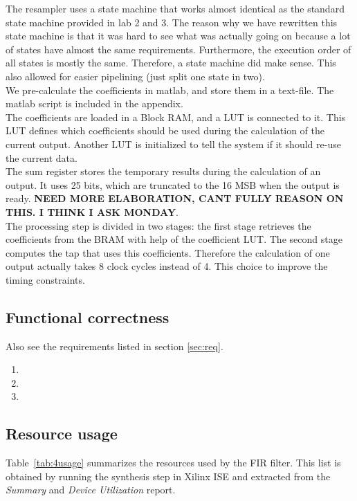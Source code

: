 \documentclass[a4paper,twoside,11pt, fleqn]{article}
\begin{document}
The resampler uses a state machine that works almost identical as the standard state machine provided in lab 2 and 3. The reason why we have rewritten this state machine is that it was hard to see what was actually going on because a lot of states have almost the same requirements. Furthermore, the execution order of all states is mostly the same. Therefore, a state machine did make sense. This also allowed for easier pipelining (just split one state in two).\\

We pre-calculate the coefficients in matlab, and store them in a text-file. The matlab script is included in the appendix.\\

The coefficients are loaded in a Block RAM, and a LUT is connected to it. This LUT defines which coefficients should be used during the calculation of the current output. Another LUT is initialized to tell the system if it should re-use the current data.\\

The sum register stores the temporary results during the calculation of an output. It uses 25 bits, which are truncated to the 16 MSB when the output is ready. 
\textbf{NEED MORE ELABORATION, CANT FULLY REASON ON THIS. I THINK I ASK MONDAY}.\\

The processing step is divided in two stages: the first stage retrieves the coefficients from the BRAM with help of the coefficient LUT. The second stage computes the tap that uses this coefficients. Therefore the calculation of one output actually takes 8 clock cycles instead of 4. This choice to improve the timing constraints.\\



\subsection{Functional correctness}
Also see the requirements listed in section \ref{sec:req}.
\begin{enumerate}
	\item <verwijzing naar plaatje>
	\item <verwijzing naar plaatje>
	\item 
\end{enumerate}

\newpage
\subsection{Resource usage}
\label{sec:resc4}
Table~\ref{tab:4usage} summarizes the resources used by the FIR filter. This list is obtained by running the synthesis step in Xilinx ISE and extracted from the \textit{Summary} and \textit{Device Utilization} report.
\end{document}

